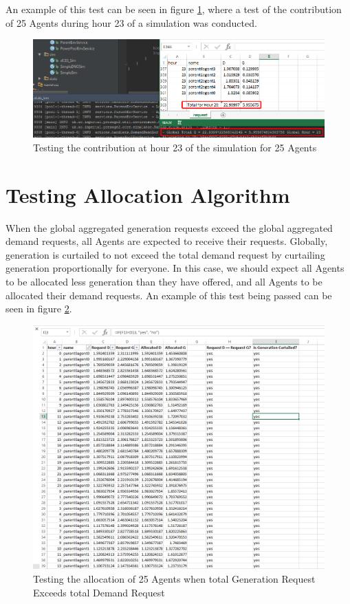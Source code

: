 An example of this test can be seen in figure \ref{fig:test1}, where a test of the contribution of 25 Agents during hour 23 of a simulation was conducted.

\clearpage

\begin{figure}[h!]
	\centering
	\includegraphics[scale=0.4]{Images/test-contribution.png}
	\caption{Testing the contribution at hour 23 of the simulation for 25 Agents}
	\label{fig:test1}
\end{figure}

\section*{Testing Allocation Algorithm}
When the global aggregated generation requests exceed the global aggregated demand requests, all Agents are expected to receive their requests. Globally, generation is curtailed to not exceed the total demand request by curtailing generation proportionally for everyone. In this case, we should expect all Agents to be allocated less generation than they have offered, and all Agents to be allocated their demand requests. An example of this test being passed can be seen in figure \ref{fig:test2}. \\

\begin{figure}[h!]
	\centering
	\includegraphics[scale=0.4]{Images/test-allocation1.png}
	\caption{Testing the allocation of 25 Agents when total Generation Request Exceeds total Demand Request}
	\label{fig:test2}
\end{figure}

